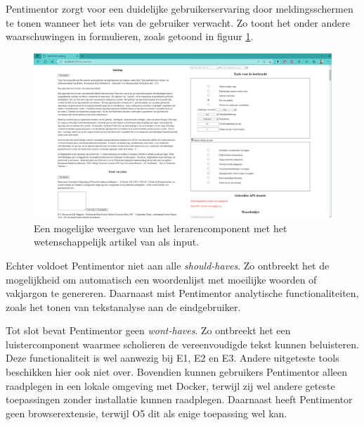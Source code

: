 \medspace

Pentimentor zorgt voor een duidelijke gebruikerservaring door meldingsschermen te tonen wanneer het iets van de gebruiker verwacht. Zo toont het onder andere waarschuwingen in formulieren, zoals getoond in figuur \ref{img:proto-lerarencomponent}.

\begin{figure}[H]
    \includegraphics[width=\linewidth]{img/proto-lerarencomponent.png}
    \caption{Een mogelijke weergave van het lerarencomponent met het wetenschappelijk artikel van \textcite{VanBrakel2022} als input.}
    \label{img:proto-lerarencomponent}
\end{figure}

Echter voldoet Pentimentor niet aan alle \textit{should-haves}. Zo ontbreekt het de mogelijkheid om automatisch een woordenlijst met moeilijke woorden of vakjargon te genereren. Daarnaast mist Pentimentor analytische functionaliteiten, zoals het tonen van tekstanalyse aan de eindgebruiker.

\medspace

Tot slot bevat Pentimentor geen \textit{wont-haves}. Zo ontbreekt het een luistercomponent waarmee scholieren de vereenvoudigde tekst kunnen beluisteren. Deze functionaliteit is wel aanwezig bij E1, E2 en E3. Andere uitgeteste tools beschikken hier ook niet over. Bovendien kunnen gebruikers Pentimentor alleen raadplegen in een lokale omgeving met Docker, terwijl zij wel andere geteste toepassingen zonder installatie kunnen raadplegen. Daarnaast heeft Pentimentor geen browserextensie, terwijl O5 dit als enige toepassing wel kan.